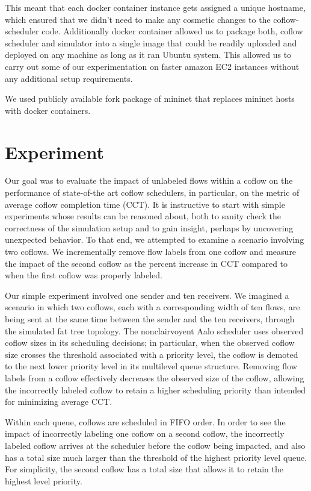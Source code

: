\documentclass[conference]{IEEEtran}
\begin{document}
This meant that each docker container instance gets assigned a unique hostname, which ensured that we didn't need to make any cosmetic changes to the coflow-scheduler code. Additionally  docker container allowed us to package both, coflow scheduler and simulator into a single image that could be readily uploaded and deployed on any machine as long as it ran Ubuntu system. This allowed us to carry out some of our experimentation on faster amazon EC2 instances without any additional setup requirements.

We used publicly available fork package of mininet \cite{dockernet} that replaces mininet hosts with docker containers.

\section{Experiment}

Our goal was to evaluate the impact of unlabeled flows within a coflow on the performance of state-of-the art coflow schedulers, in particular, on the metric of average coflow completion time (CCT). It is instructive to start with simple experiments whose results can be reasoned about, both to sanity check the correctness of the simulation setup and to gain insight, perhaps by uncovering unexpected behavior. 
To that end, we attempted to examine a scenario involving two coflows. We incrementally remove flow labels from one coflow and measure the impact of the second coflow as the percent increase in CCT compared to when the first coflow was properly labeled.

Our simple experiment involved one sender and ten receivers. We imagined a scenario in which two coflows, each with a corresponding width of ten flows, are being sent at the same time between the sender and the ten receivers, through the simulated fat tree topology. The nonclairvoyent Aalo scheduler uses observed coflow sizes in its scheduling decisions; in particular, when the observed coflow size crosses the threshold associated with a priority level, the coflow is demoted to the next lower priority level in its multilevel queue structure. Removing flow labels from a coflow effectively decreases the observed size of the coflow, allowing the incorrectly labeled coflow to retain a higher scheduling priority than intended for minimizing average CCT.

Within each queue, coflows are scheduled in FIFO order. In order to see the impact of incorrectly labeling one coflow on a second coflow, the incorrectly labeled coflow arrives at the scheduler before the coflow being impacted, and also has a total size much larger than the threshold of the highest priority level queue. For simplicity, the second coflow has a total size that allows it to retain the highest level priority.
\end{document}

